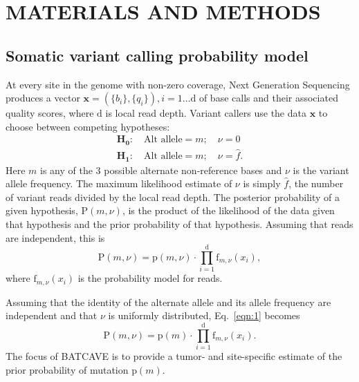 \documentclass[a4,center,fleqn]{NAR}
\newcommand{\batcave}{BATCAVE }
\begin{document}
\section{MATERIALS AND METHODS}
\subsection{Somatic variant calling probability model}

At every site in the genome with non-zero coverage, Next Generation Sequencing produces a vector $\mathbf{x}  = (\{b_i\},\{q_i\}), i = 1\dots \mathrm{d}$ of base calls and their associated quality scores, where $\mathrm{d}$ is local read depth.
Variant callers use the data $\mathbf{x}$ to choose between competing hypotheses:
\begin{equation}
  \label{eqn:hypothesis}
  \begin{array}{l}
    \mathbf{H_0}:\quad \textrm{Alt allele} = m;\quad\nu = 0\\
    \mathbf{H_1}:\quad \textrm{Alt allele} = m;\quad\nu = \hat{f}.
  \end{array}
\end{equation}
Here $m$ is any of the 3 possible alternate non-reference bases and $\nu$ is the variant allele frequency.
The maximum likelihood estimate of $\nu$ is simply $\hat{f}$, the number of variant reads divided by the local read depth.
The posterior probability of a given hypothesis, $\mathrm{P}(m,\nu)$, is the product of the likelihood of the data given that hypothesis and the prior probability of that hypothesis. 
Assuming that reads are independent, this is
\begin{equation}\label{eqn:1}
  \mathrm{P}(m,\nu) = \mathrm{p}(m,\nu) \cdot \prod_{i=1}^{\mathrm{d}} \textrm{f}_{m,\nu}(x_i),
\end{equation}
where $\textrm{f}_{m,\nu}(x_i)$ is the probability model for reads.

Assuming that the identity of the alternate allele and its allele frequency are independent and that $\nu$ is uniformly distributed, Eq.~\ref{eqn:1} becomes
\begin{equation}  \label{eqn:2}
  \mathrm{P}(m,\nu) = \mathrm{p}(m) \cdot \prod_{i=1}^{\mathrm{d}} \textrm{f}_{m,\nu}(x_i).
\end{equation}
The focus of \batcave is to provide a tumor- and site-specific estimate of the prior probability of mutation $\mathrm{p}(m)$.
\end{document}
